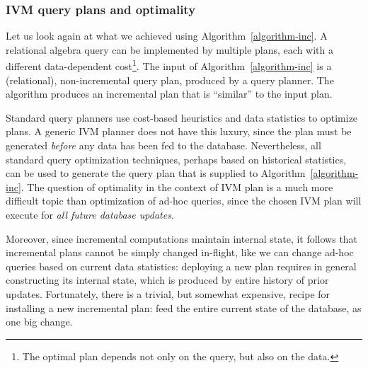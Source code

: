 \subsubsection{IVM query plans and optimality}

Let us look again at what we achieved using
Algorithm~\ref{algorithm-inc}.  A relational algebra query can be
implemented by multiple plans, each with a different data-dependent
cost\footnote{The optimal plan depends not only on the query, but also
  on the data.}.  The input of Algorithm~\ref{algorithm-inc} is a
(relational), non-incremental query plan, produced by a query planner.
The algorithm produces an incremental plan that is ``similar'' to the
input plan.

Standard query planners use cost-based heuristics and data statistics
to optimize plans.  A generic IVM planner does not have this luxury,
since the plan must be generated \emph{before} any data has been fed
to the database.  Nevertheless, all standard query optimization
techniques, perhaps based on historical statistics, can be used to
generate the query plan that is supplied to
Algorithm~\ref{algorithm-inc}.  The question of optimality in the
context of IVM plan is a much more difficult topic than optimization
of ad-hoc queries, since the chosen IVM plan will execute for
\emph{all future database updates}.

Moreover, since incremental computations maintain internal state, it
follows that incremental plans cannot be simply changed in-flight,
like we can change ad-hoc queries based on current data statistics:
deploying a new plan requires in general constructing its internal
state, which is produced by entire history of prior updates.
Fortunately, there is a trivial, but somewhat expensive, recipe for
installing a new incremental plan: feed the entire current state of
the database, as one big change.


